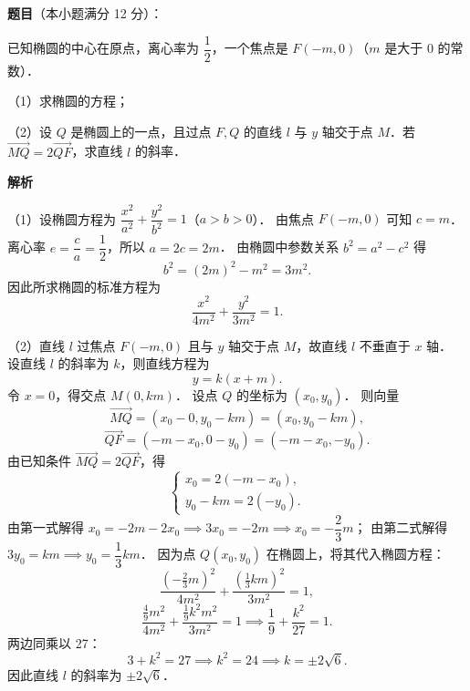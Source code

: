 \begin{answer}

\textbf{题目}（本小题满分 12 分）：

已知椭圆的中心在原点，离心率为 $\dfrac{1}{2}$，一个焦点是 $F(-m, 0)$（$m$ 是大于 0 的常数）．

（1）求椭圆的方程；

（2）设 $Q$ 是椭圆上的一点，且过点 $F, Q$ 的直线 $l$ 与 $y$ 轴交于点 $M$．若 $\vec{MQ} = 2\vec{QF}$，求直线 $l$ 的斜率．

\textbf{解析}

（1）设椭圆方程为 $\dfrac{x^2}{a^2} + \dfrac{y^2}{b^2} = 1$（$a > b > 0$）．
由焦点 $F(-m, 0)$ 可知 $c = m$．
离心率 $e = \dfrac{c}{a} = \dfrac{1}{2}$，所以 $a = 2c = 2m$．
由椭圆中参数关系 $b^2 = a^2 - c^2$ 得
\nopagebreak[4]
\[
b^2 = (2m)^2 - m^2 = 3m^2.
\]
因此所求椭圆的标准方程为
\nopagebreak[4]
\[
\frac{x^2}{4m^2} + \frac{y^2}{3m^2} = 1.
\]

（2）直线 $l$ 过焦点 $F(-m, 0)$ 且与 $y$ 轴交于点 $M$，故直线 $l$ 不垂直于 $x$ 轴．
设直线 $l$ 的斜率为 $k$，则直线方程为
\nopagebreak[4]
\[
y = k(x + m).
\]
令 $x = 0$，得交点 $M(0, km)$．
设点 $Q$ 的坐标为 $(x_0, y_0)$．
则向量
\nopagebreak[4]
\[
\vec{MQ} = (x_0 - 0, y_0 - km) = (x_0, y_0 - km),
\]
\nopagebreak[4]
\[
\vec{QF} = (-m - x_0, 0 - y_0) = (-m - x_0, -y_0).
\]
由已知条件 $\vec{MQ} = 2\vec{QF}$，得
\nopagebreak[4]
\[
\begin{cases}
x_0 = 2(-m - x_0), \\
y_0 - km = 2(-y_0).
\end{cases}
\]
由第一式解得 $x_0 = -2m - 2x_0 \implies 3x_0 = -2m \implies x_0 = -\dfrac{2}{3}m$；
由第二式解得 $3y_0 = km \implies y_0 = \dfrac{1}{3}km$．
因为点 $Q(x_0, y_0)$ 在椭圆上，将其代入椭圆方程：
\nopagebreak[4]
\[
\frac{\left(-\frac{2}{3}m\right)^2}{4m^2} + \frac{\left(\frac{1}{3}km\right)^2}{3m^2} = 1,
\]
\nopagebreak[4]
\[
\frac{\frac{4}{9}m^2}{4m^2} + \frac{\frac{1}{9}k^2 m^2}{3m^2} = 1 \implies \frac{1}{9} + \frac{k^2}{27} = 1.
\]
两边同乘以 27：
\nopagebreak[4]
\[
3 + k^2 = 27 \implies k^2 = 24 \implies k = \pm 2\sqrt{6}.
\]
因此直线 $l$ 的斜率为 $\pm 2\sqrt{6}$．


\end{answer}
